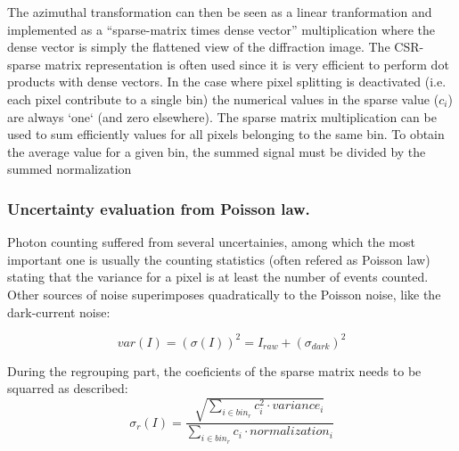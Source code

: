 \documentclass[preprint]{iucr}              %
\begin{document}
The azimuthal transformation can then be seen as a linear tranformation and implemented as a ``sparse-matrix times dense vector'' multiplication 
where the dense vector is simply the flattened view of the diffraction image\cite{pyFAI_gpu}. 
The CSR-sparse matrix representation is often used since it is very efficient to perform dot products with dense vectors.
In the case where pixel splitting is deactivated (i.e. each pixel contribute to a single bin) the numerical values in the sparse value ($c_i$) are always `one` (and zero elsewhere).
The sparse matrix multiplication can be used to sum efficiently values for all pixels belonging to the same bin.
To obtain the average value for a given bin, the summed signal must be divided by the summed normalization 
  
\subsubsection{Uncertainty evaluation from Poisson law.}
Photon counting suffered from several uncertainies, among which the most important one is usually the counting statistics (often refered as Poisson law)
stating that the variance for a pixel is at least the number of events counted.
Other sources of noise superimposes quadratically to the Poisson noise, like the dark-current noise:     

\begin{equation}
var(I) = (\sigma(I))^{2} = I_{raw} + (\sigma_{dark})^{2}  
\end{equation}

During the regrouping part, the coeficients of the sparse matrix needs to be squarred as described: 
\begin{equation}
\sigma_{r}(I) = \frac{\sqrt{\sum\limits_{i \in bin_r} c_i^2 \cdot variance_i}}
                  {\sum\limits_{i \in bin_r} c_i \cdot normalization_i} 
\end{equation}
\end{document}
